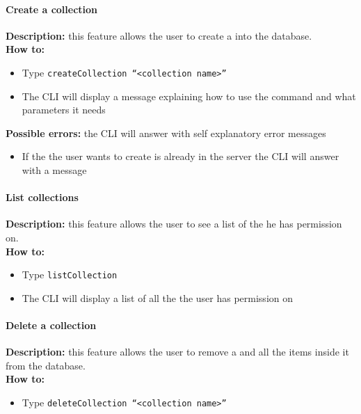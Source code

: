 \documentclass{scalatekids-article}
\begin{document}
\paragraph{Create a collection}
\label{sec:createcollection}
\textbf{Description:} this feature allows the user to create a
 into the database.\\
\textbf{How to:}
\begin{itemize}
\item Type \texttt{createCollection ``<collection name>''}
\item The CLI will display a message explaining how to use the command and what parameters it needs
\end{itemize}
\textbf{Possible errors:} the CLI will answer with self explanatory error messages
\begin{itemize}
\item If the  the user wants to create is already in the server the CLI will answer with a message
\end{itemize}

\paragraph{List collections}
\label{sec:listcollection}
\textbf{Description:} this feature allows the user to see a list of
the  he has permission on.\\
\textbf{How to:}
\begin{itemize}
\item Type \texttt{listCollection}
\item The CLI will display a list of all the  the user has
  permission on
\end{itemize}

\paragraph{Delete a collection}
\label{sec:deletecollection}
\textbf{Description:} this feature allows the user to remove a  and all the items inside it from the database.\\
\textbf{How to:}
\begin{itemize}
\item Type \texttt{deleteCollection ``<collection name>''}
\end{itemize}
\end{document}
